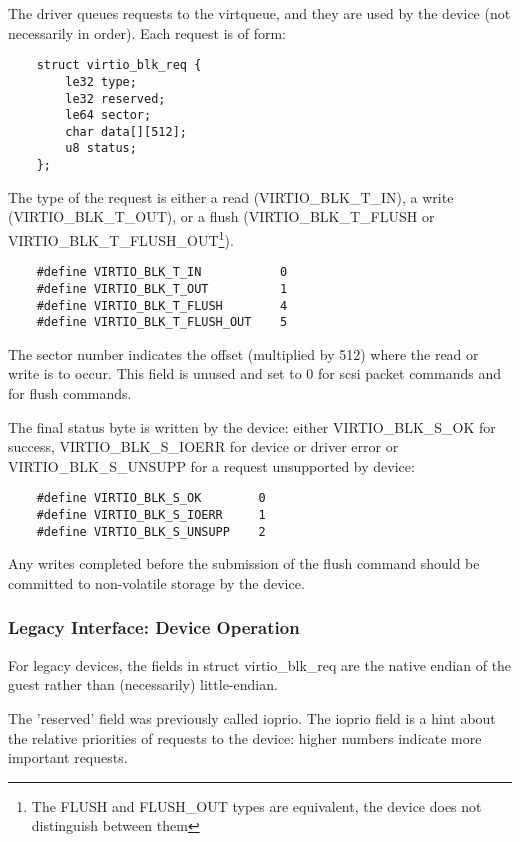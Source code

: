 The driver queues requests to the virtqueue, and they are used by
the device (not necessarily in order). Each request is of form:

\begin{lstlisting}
	struct virtio_blk_req {
		le32 type;
		le32 reserved;
		le64 sector;
		char data[][512];
		u8 status;
	};
\end{lstlisting}

The type of the request is either a read (VIRTIO_BLK_T_IN), a write
(VIRTIO_BLK_T_OUT), or a flush (VIRTIO_BLK_T_FLUSH or
VIRTIO_BLK_T_FLUSH_OUT\footnote{The FLUSH and FLUSH_OUT types are equivalent, the device does not
distinguish between them
}).

\begin{lstlisting}
	#define VIRTIO_BLK_T_IN           0
	#define VIRTIO_BLK_T_OUT          1
	#define VIRTIO_BLK_T_FLUSH        4
	#define VIRTIO_BLK_T_FLUSH_OUT    5
\end{lstlisting}

The sector number indicates the offset (multiplied by 512) where
the read or write is to occur. This field is unused and set to 0
for scsi packet commands and for flush commands.

The final status byte is written by the device: either
VIRTIO_BLK_S_OK for success, VIRTIO_BLK_S_IOERR for device or driver
error or VIRTIO_BLK_S_UNSUPP for a request unsupported by device:

\begin{lstlisting}
	#define VIRTIO_BLK_S_OK        0
	#define VIRTIO_BLK_S_IOERR     1
	#define VIRTIO_BLK_S_UNSUPP    2
\end{lstlisting}

Any writes completed before the submission of the flush command should
be committed to non-volatile storage by the device.

\subsubsection{Legacy Interface: Device Operation}\label{sec:Device Types / Block Device / Device Operation / Legacy Interface: Device Operation}
For legacy devices, the fields in struct virtio_blk_req are the
native endian of the guest rather than (necessarily) little-endian.

The 'reserved' field was previously called ioprio.  The ioprio field
is a hint about the relative priorities of requests to the device:
higher numbers indicate more important requests.

